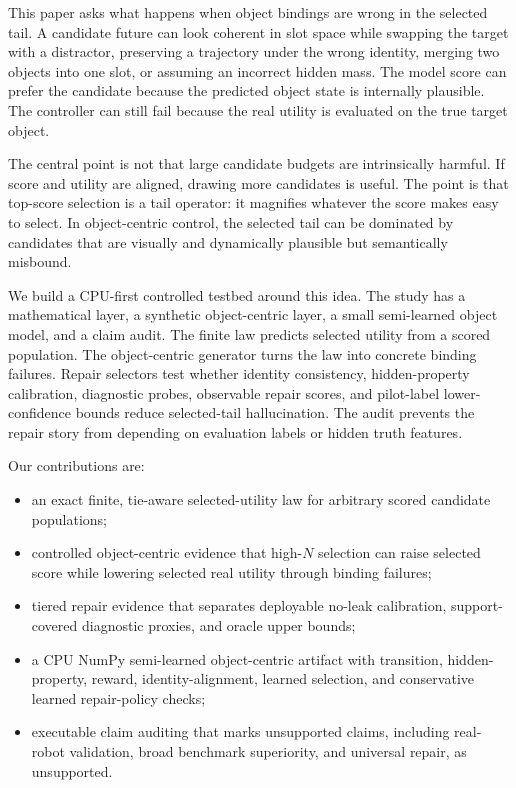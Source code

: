 \documentclass[10pt]{article}
\begin{document}
This paper asks what happens when object bindings are wrong in the selected tail. A candidate future can look coherent in slot space while swapping the target with a distractor, preserving a trajectory under the wrong identity, merging two objects into one slot, or assuming an incorrect hidden mass. The model score can prefer the candidate because the predicted object state is internally plausible. The controller can still fail because the real utility is evaluated on the true target object.

The central point is not that large candidate budgets are intrinsically harmful. If score and utility are aligned, drawing more candidates is useful. The point is that top-score selection is a tail operator: it magnifies whatever the score makes easy to select. In object-centric control, the selected tail can be dominated by candidates that are visually and dynamically plausible but semantically misbound.

We build a CPU-first controlled testbed around this idea. The study has a mathematical layer, a synthetic object-centric layer, a small semi-learned object model, and a claim audit. The finite law predicts selected utility from a scored population. The object-centric generator turns the law into concrete binding failures. Repair selectors test whether identity consistency, hidden-property calibration, diagnostic probes, observable repair scores, and pilot-label lower-confidence bounds reduce selected-tail hallucination. The audit prevents the repair story from depending on evaluation labels or hidden truth features.

Our contributions are:
\begin{itemize}
  \item an exact finite, tie-aware selected-utility law for arbitrary scored candidate populations;
  \item controlled object-centric evidence that high-$N$ selection can raise selected score while lowering selected real utility through binding failures;
  \item tiered repair evidence that separates deployable no-leak calibration, support-covered diagnostic proxies, and oracle upper bounds;
  \item a CPU NumPy semi-learned object-centric artifact with transition, hidden-property, reward, identity-alignment, learned selection, and conservative learned repair-policy checks;
  \item executable claim auditing that marks unsupported claims, including real-robot validation, broad benchmark superiority, and universal repair, as unsupported.
\end{itemize}
\end{document}
